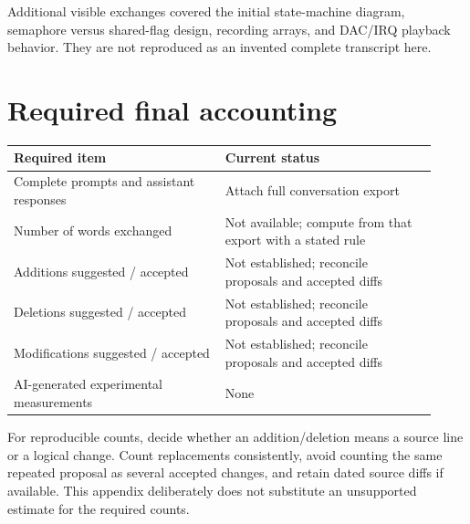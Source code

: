 \documentclass[11pt,letterpaper]{article}
\begin{document}
Additional visible exchanges covered the initial state-machine diagram, semaphore versus shared-flag design, recording arrays, and DAC/IRQ playback behavior. They are not reproduced as an invented complete transcript here.

\section*{Required final accounting}

\begingroup\small
\setlength{\tabcolsep}{5pt}
\begin{longtable}{|>{\raggedright\arraybackslash}p{0.458\linewidth}|>{\raggedright\arraybackslash}p{0.458\linewidth}|}
\hline
\textbf{Required item} & \textbf{Current status} \\ \hline
\endhead
Complete prompts and assistant responses & Attach full conversation export \\ \hline
Number of words exchanged & Not available; compute from that export with a stated rule \\ \hline
Additions suggested / accepted & Not established; reconcile proposals and accepted diffs \\ \hline
Deletions suggested / accepted & Not established; reconcile proposals and accepted diffs \\ \hline
Modifications suggested / accepted & Not established; reconcile proposals and accepted diffs \\ \hline
AI-generated experimental measurements & None \\ \hline
\end{longtable}
\endgroup

For reproducible counts, decide whether an addition/deletion means a source line or a logical change. Count replacements consistently, avoid counting the same repeated proposal as several accepted changes, and retain dated source diffs if available. This appendix deliberately does not substitute an unsupported estimate for the required counts.
\end{document}
